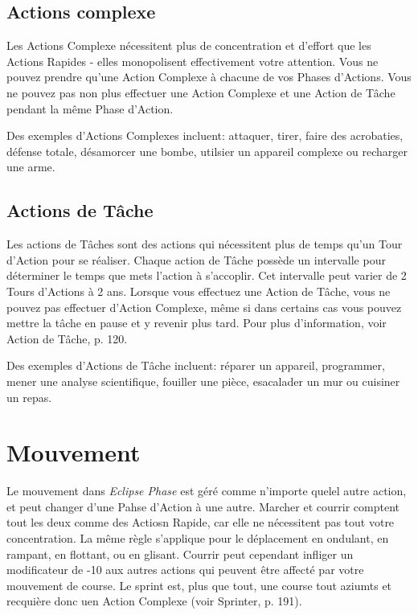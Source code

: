 \subsection{Actions complexe} \label{sec:combat-complex-actions} 

Les Actions Complexe nécessitent plus de concentration et d'effort que les Actions Rapides - elles monopolisent effectivement votre attention. Vous ne pouvez prendre qu'une Action Complexe à chacune de vos Phases d'Actions. Vous ne pouvez pas non plus effectuer une Action Complexe et une Action de Tâche pendant la même Phase d'Action. 

Des exemples d'Actions Complexes incluent: attaquer, tirer, faire des acrobaties, défense totale, désamorcer une bombe, utilsier un appareil complexe ou recharger une arme. 



\subsection{Actions de Tâche} \label{sec:combat-task-actions} 

Les actions de Tâches sont des actions qui nécessitent plus de temps qu'un Tour d'Action pour se réaliser. Chaque action de Tâche possède un intervalle pour déterminer le temps que mets l'action à s'accoplir. Cet intervalle peut varier de 2 Tours d'Actions à 2 ans. Lorsque vous effectuez une Action de Tâche, vous ne pouvez pas effectuer d'Action Complexe, même si dans certains cas vous pouvez mettre la tâche en pause et y revenir plus tard. Pour plus d'information, voir Action de Tâche, p. 120. 

Des exemples d'Actions de Tâche incluent: réparer un appareil, programmer, mener une analyse scientifique, fouiller une pièce, esacalader un mur ou cuisiner un repas. 



\section{Mouvement} \label{sec:combat-movement} 

Le mouvement dans \emph{Eclipse Phase} est géré comme n'importe quelel autre action, et peut changer d'une Pahse d'Action à une autre. Marcher et courrir comptent tout les deux comme des Actiosn Rapide, car elle ne nécessitent pas tout votre concentration. La même règle s'applique pour le déplacement en ondulant, en rampant, en flottant, ou en glisant. Courrir peut cependant infliger un modificateur de -10 aux autres actions qui peuvent être affecté par votre mouvement de course. Le sprint est, plus que tout, une course tout aziumts et recquière donc uen Action Complexe (voir Sprinter, p. 191). 

